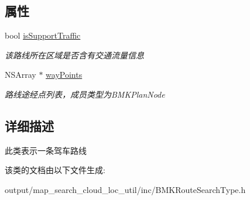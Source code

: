 \subsection*{属性}
\begin{DoxyCompactItemize}
\item 
\hypertarget{interface_b_m_k_driving_route_line_a23c30bf764fd27531e7f7d1e1cb1d6b4}{bool \hyperlink{interface_b_m_k_driving_route_line_a23c30bf764fd27531e7f7d1e1cb1d6b4}{is\+Support\+Traffic}}\label{interface_b_m_k_driving_route_line_a23c30bf764fd27531e7f7d1e1cb1d6b4}

\begin{DoxyCompactList}\small\item\em 该路线所在区域是否含有交通流量信息 \end{DoxyCompactList}\item 
\hypertarget{interface_b_m_k_driving_route_line_a577c5a10368ef9c18ac73f20836092bd}{N\+S\+Array $\ast$ \hyperlink{interface_b_m_k_driving_route_line_a577c5a10368ef9c18ac73f20836092bd}{way\+Points}}\label{interface_b_m_k_driving_route_line_a577c5a10368ef9c18ac73f20836092bd}

\begin{DoxyCompactList}\small\item\em 路线途经点列表，成员类型为\+B\+M\+K\+Plan\+Node \end{DoxyCompactList}\end{DoxyCompactItemize}


\subsection{详细描述}
此类表示一条驾车路线 

该类的文档由以下文件生成\+:\begin{DoxyCompactItemize}
\item 
output/map\+\_\+search\+\_\+cloud\+\_\+loc\+\_\+util/inc/B\+M\+K\+Route\+Search\+Type.\+h\end{DoxyCompactItemize}
